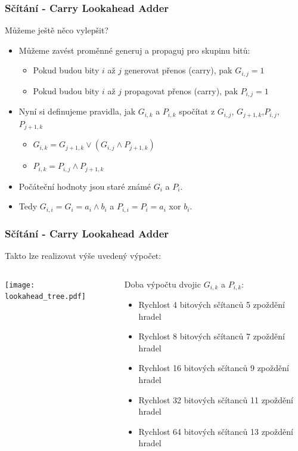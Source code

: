 \documentclass{beamer}
\begin{document}
\begin{frame}
\frametitle{Sčítání - Carry Lookahead Adder}

Můžeme ještě něco vylepšit?
\begin{itemize}
\item Můžeme zavést proměnné generuj a propaguj pro skupinu bitů:
\begin{itemize}
\item Pokud budou bity $i$ až $j$ generovat přenos (carry), pak $G_{i,j}=1$
\item Pokud budou bity $i$ až $j$ propagovat přenos (carry), pak $P_{i,j}=1$
\end{itemize}
\item Nyní si definujeme pravidla, jak $G_{i,k}$ a $P_{i,k}$ spočítat z $G_{i,j}$, $G_{j+1,k}$,$P_{i,j}$, $P_{j+1,k}$
\begin{itemize}
\item $G_{i,k}=G_{j+1,k} \lor (G_{i,j} \land P_{j+1,k})$
\item $P_{i,k}=P_{i,j} \land P_{j+1,k}$
\end{itemize}
\item Počáteční hodnoty jsou staré známé $G_i$ a $P_i$. 
\item Tedy $G_{i,i}=G_i=a_i \land b_i$ a $P_{i,i}=P_i=a_i$ xor $b_i$.
\end{itemize}

\end{frame}



\begin{frame}
\frametitle{Sčítání - Carry Lookahead Adder}

Takto lze realizovat výše uvedený výpočet:
\begin{columns}
\begin{column}{0.55\textwidth}
\begin{center}
   \texttt{[image: lookahead\_tree.pdf]}
\end{center}
\end{column}
\begin{column}{0.45\textwidth}

Doba výpočtu dvojic $G_{i,k}$ a $P_{i,k}$:
\begin{itemize}
\item Rychlost 4 bitových sčítanců 5 zpoždění hradel
\item Rychlost 8 bitových sčítanců 7 zpoždění hradel
\item Rychlost 16 bitových sčítanců 9 zpoždění hradel
\item Rychlost 32 bitových sčítanců 11 zpoždění hradel
\item Rychlost 64 bitových sčítanců 13 zpoždění hradel
\end{itemize}

\end{column}
\end{columns}

\end{frame}
\end{document}
